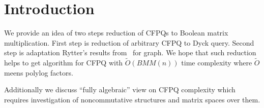 \section{Introduction}

We provide an idea of two steps reduction of CFPQs to Boolean matrix multiplication.
First step is reduction of arbitrary CFPQ to Dyck query.
Second step is adaptation Rytter's results from~\cite{Rytter} for graph.
We hope that such reduction helps to get algorithm for CFPQ with $\widetilde{O}(BMM(n))$ time complexity where $\widetilde{O}$ meens polylog factors.

Additionally we discuss ``fully algebraic'' view on CFPQ complexity which requires investigation of noncommutative structures and matrix spaces over them.